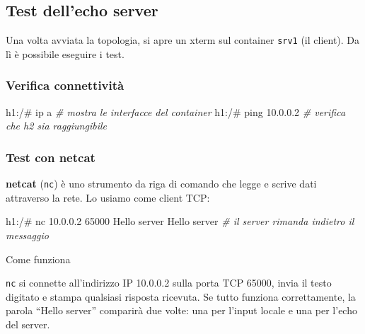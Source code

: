\documentclass[
  italian,
  openany]{book}
\newenvironment{Shaded}{\begin{snugshade}}{\end{snugshade}}
\newcommand{\CommentTok}[1]{\textcolor[rgb]{0.56,0.35,0.01}{\textit{#1}}}
\newcommand{\ExtensionTok}[1]{#1}
\newcommand{\NormalTok}[1]{#1}
\begin{document}
\subsection{Test dell'echo server}\label{test-dellecho-server}

Una volta avviata la topologia, si apre un xterm sul container
\texttt{srv1} (il client). Da lì è possibile eseguire i test.

\subsubsection{Verifica connettività}\label{verifica-connettivituxe0}

\begin{Shaded}
\begin{Highlighting}[]
\ExtensionTok{h1:/\#}\NormalTok{ ip a                  }\CommentTok{\# mostra le interfacce del container}
\ExtensionTok{h1:/\#}\NormalTok{ ping 10.0.0.2         }\CommentTok{\# verifica che h2 sia raggiungibile}
\end{Highlighting}
\end{Shaded}

\subsubsection{Test con netcat}\label{test-con-netcat}

\textbf{netcat} (\texttt{nc}) è uno strumento da riga di comando che
legge e scrive dati attraverso la rete. Lo usiamo come client TCP:

\begin{Shaded}
\begin{Highlighting}[]
\ExtensionTok{h1:/\#}\NormalTok{ nc 10.0.0.2 65000}
\ExtensionTok{Hello}\NormalTok{ server}
\ExtensionTok{Hello}\NormalTok{ server        }\CommentTok{\# il server rimanda indietro il messaggio}
\end{Highlighting}
\end{Shaded}

\begin{callouttip}{Come funziona}

\texttt{nc} si connette all'indirizzo IP 10.0.0.2 sulla porta TCP 65000,
invia il testo digitato e stampa qualsiasi risposta ricevuta. Se tutto
funziona correttamente, la parola ``Hello server'' comparirà due volte:
una per l'input locale e una per l'echo del server.

\end{callouttip}
\end{document}
